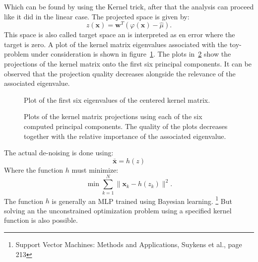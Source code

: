 Which can be found by using the Kernel trick, after that the analysis can proceed like it did in the linear case. The projected space is given by:
\begin{equation}
z(\mathbf{x}) = \mathbf{w}^T(\varphi(\mathbf{x}) - \hat{\mu}).
\end{equation}
This space is also called target space an is interpreted as en error where the target is zero. A plot of the kernel matrix eigenvalues associated with the toy-problem under consideration is shown in figure~\ref{fig:toyEig}. The plots in~\ref{fig:toyProj} show the  projections of the kernel matrix onto the first six principal components. It can be observed that the projection quality decreases alongside the relevance of the associated eigenvalue.
\begin{figure}
\centering

\caption{Plot of the first six eigenvalues of the centered kernel matrix.}
\label{fig:toyEig}
\end{figure}
\begin{figure}
\centering






\caption{Plots of the kernel matrix projections using each of the six computed principal components. The quality of the plots decreases together with the relative importance of the associated eigenvalue.  }
\label{fig:toyProj}
\end{figure}
The actual de-noising is done using:
\begin{equation}
\bar{\mathbf{x}} = h(z)
\end{equation}
Where the function $h$ must minimize:
\begin{equation}
\min \sum\limits_{k=1}^{N} \| \mathbf{x}_k - h(z_k)\|^2.
\end{equation} 
The function $h$ is generally an MLP trained using Bayesian learning. \footnote{Support Vector Machines: Methods and Applications, Suykens et al., page 213} But solving an the unconstrained optimization problem using a specified kernel function is also possible.  